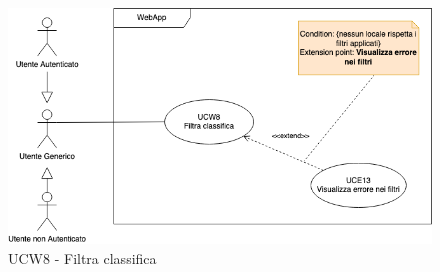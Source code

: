 \begin{figure}[!h]
\centering
    \includegraphics[scale=0.5]{UC_images/UCW8.png}
    \caption{UCW8 - Filtra classifica}
\end{figure}

